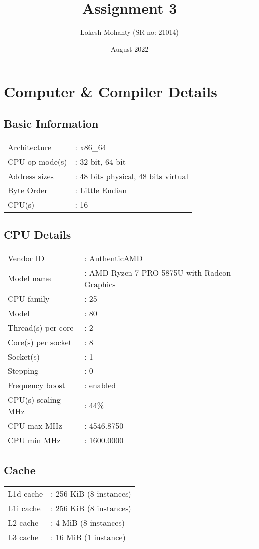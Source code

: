 \documentclass[12pt, letterpaper]{article}
\title{Assignment 3}
\author{Lokesh Mohanty (SR no: 21014)}
\date{August 2022}
\begin{document}
\maketitle

\section{Computer \& Compiler Details}
\label{sec:comp}

\subsection{Basic Information}
\label{sec:basic}
\begin{tabular}{@{$\bullet$ }ll}
  Architecture    &: x86\_64\\
  CPU op-mode(s)  &: 32-bit, 64-bit\\
  Address sizes   &: 48 bits physical, 48 bits virtual\\
  Byte Order      &: Little Endian\\
  CPU(s)          &: 16\\
\end{tabular}

\subsection{CPU Details}
\label{sec:cpu}
\begin{tabular}{@{$\bullet$ }ll}
  Vendor ID       &: AuthenticAMD\\
  Model name            &: AMD Ryzen 7 PRO 5875U with Radeon Graphics\\
  CPU family            &: 25\\
  Model                 &: 80\\
  Thread(s) per core    &: 2\\
  Core(s) per socket    &: 8\\
  Socket(s)             &: 1\\
  Stepping              &: 0\\
  Frequency boost       &: enabled\\
  CPU(s) scaling MHz    &: 44\%\\
  CPU max MHz           &: 4546.8750\\
  CPU min MHz           &: 1600.0000\\
\end{tabular}

\subsection{Cache}
\label{sec:cache}
\begin{tabular}{@{$\bullet$ }ll}
  L1d cache  &: 256 KiB (8 instances)\\
  L1i cache  &: 256 KiB (8 instances)\\
  L2 cache   &: 4 MiB (8 instances)\\
  L3 cache   &: 16 MiB (1 instance)\\
\end{tabular}
\end{document}
